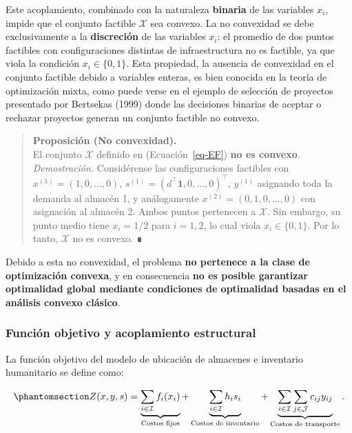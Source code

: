 \documentclass[
  spanish,
  us-letterpaper,
]{scrreprt}
\numberwithin{equation}{section}
\begin{document}
Este acoplamiento, combinado con la naturaleza \textbf{binaria} de las
variables \(x_i\), impide que el conjunto factible \(\mathcal{X}\) sea
convexo. La no convexidad se debe exclusivamente a la
\textbf{discreción} de las variables \(x_i\): el promedio de dos puntos
factibles con configuraciones distintas de infraestructura no es
factible, ya que viola la condición \(x_i \in \{0,1\}\). Esta propiedad,
la ausencia de convexidad en el conjunto factible debido a variables
enteras, es bien conocida en la teoría de optimización mixta, como puede
verse en el ejemplo de selección de proyectos presentado por Bertsekas
(1999) donde las decisiones binarias de aceptar o rechazar proyectos
generan un conjunto factible no convexo.

\begin{quote}
\textbf{Proposición (No convexidad).}\\
El conjunto \(\mathcal{X}\) definido en (Ecuación~\ref{eq-EF})
\textbf{no es convexo}.\\
\emph{Demostración.} Considérense las configuraciones factibles con
\(x^{(1)} = (1,0,\dots,0)\),
\(s^{(1)} = (d^\top \mathbf{1}, 0, \dots, 0)^\top\), \(y^{(1)}\)
asignando toda la demanda al almacén 1, y análogamente
\(x^{(2)} = (0,1,0,\dots,0)\) con asignación al almacén 2. Ambos puntos
pertenecen a \(\mathcal{X}\). Sin embargo, su punto medio tiene
\(x_i = 1/2\) para \(i=1,2\), lo cual viola \(x_i \in \{0,1\}\). Por lo
tanto, \(\mathcal{X}\) no es convexo. ∎
\end{quote}

Debido a esta no convexidad, el problema \textbf{no pertenece a la clase
de optimización convexa}, y en consecuencia \textbf{no es posible
garantizar optimalidad global mediante condiciones de optimalidad
basadas en el análisis convexo clásico}.

\subsubsection{Función objetivo y acoplamiento
estructural}\label{sec-acoplamiento}

La función objetivo del modelo de ubicación de almacenes e inventario
humanitario se define como:

\begin{equation}\phantomsection\label{eq-Z_xys}{
Z(x,y,s) 
= 
\underbrace{\sum_{i\in\mathcal{I}} f_i(x_i)}_{\text{Costos fijos}}
+ \underbrace{\sum_{i\in\mathcal{I}} h_i s_i}_{\text{Costos de inventario}}
+ \underbrace{\sum_{i\in\mathcal{I}}\sum_{j\in\mathcal{J}} c_{ij} y_{ij}}_{\text{Costos de transporte}}.
}\end{equation}
\end{document}
